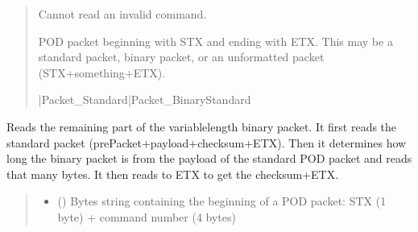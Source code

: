 \documentclass[letterpaper,10pt,english]{sphinxmanual}
\begin{document}
\begin{fulllineitems}
\begin{fulllineitems}
\begin{quote}
\begin{description}
\sphinxAtStartPar
{} \textendash{} Cannot read an invalid command.

\sphinxAtStartPar
POD packet beginning with STX and ending                 with ETX. This may be a standard packet, binary packet, or an unformatted packet                 (STX+something+ETX).

\sphinxAtStartPar
{\hyperref[\detokenize{Morelia.Packets:Morelia.Packets.Packet.Packet}]{}}|Packet\_Standard|Packet\_BinaryStandard

\end{description}\end{quote}

\end{fulllineitems}


\begin{fulllineitems}
\label{\detokenize{Morelia.Devices:Morelia.Devices.BasicPodProtocol.Pod._Read_Binary}}
\pysigstartsignatures
{}
\pysigstopsignatures
\sphinxAtStartPar
Reads the remaining part of the variable\sphinxhyphen{}length binary packet. It first reads the standard         packet (prePacket+payload+checksum+ETX). Then it determines how long the binary packet is from the         payload of the standard POD packet and reads that many bytes. It then reads to ETX to get the         checksum+ETX.
\begin{quote}\begin{description}
\begin{itemize}
\item {} 
\sphinxAtStartPar
{} () \textendash{} Bytes string containing the beginning of a POD packet: STX (1 byte)                 + command number (4 bytes)


\end{itemize}
\end{description}
\end{quote}
\end{fulllineitems}
\end{fulllineitems}
\end{document}
